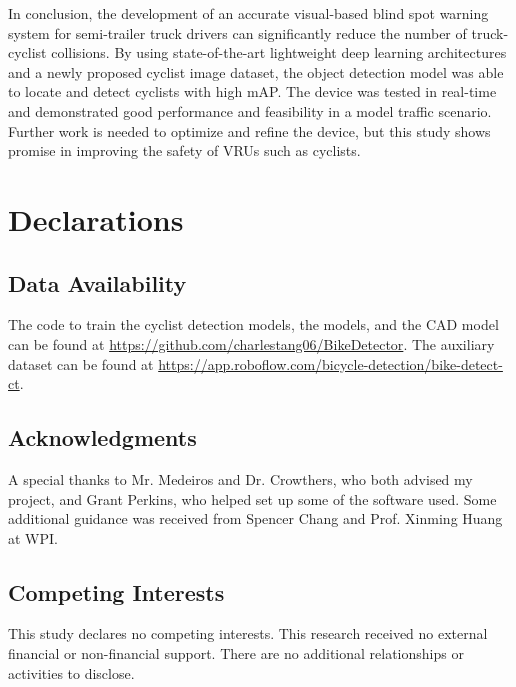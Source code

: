 \documentclass{article}
\begin{document}
In conclusion, the development of an accurate visual-based blind spot warning system for semi-trailer truck drivers can significantly reduce the number of truck-cyclist collisions. By using state-of-the-art lightweight deep learning architectures and a newly proposed cyclist image dataset, the object detection model was able to locate and detect cyclists with high mAP. The device was tested in real-time and demonstrated good performance and feasibility in a model traffic scenario. Further work is needed to optimize and refine the device, but this study shows promise in improving the safety of VRUs such as cyclists.

\section*{Declarations}
\subsection*{Data Availability}
The code to train the cyclist detection models, the models, and the CAD model can be found at \url{https://github.com/charlestang06/BikeDetector}. The auxiliary dataset can be found at \url{https://app.roboflow.com/bicycle-detection/bike-detect-ct}.

\subsection*{Acknowledgments}
A special thanks to Mr. Medeiros and Dr. Crowthers, who both advised my project, and Grant Perkins, who helped set up some of the software used. Some additional guidance was received from Spencer Chang and Prof. Xinming Huang at WPI. 

\subsection*{Competing Interests}
This study declares no competing interests. This research received no external financial or non-financial support. There are no additional relationships or activities to disclose. 

  
  
\end{document}
